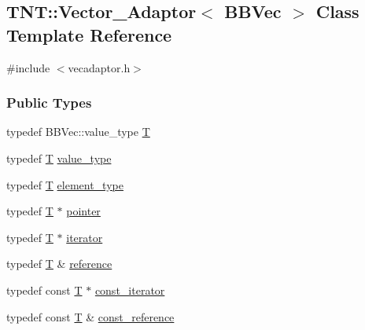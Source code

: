 \subsection{TNT::Vector\_\-Adaptor$<$ BBVec $>$ Class Template Reference}
\label{class_t_n_t_1_1_vector___adaptor}


{\ttfamily \#include $<$vecadaptor.h$>$}

\subsubsection*{Public Types}
\begin{DoxyCompactItemize}
\item 
typedef BBVec::value\_\-type \hyperlink{class_t_n_t_1_1_vector___adaptor_a8f689dfb94d76130f5327e00f2d10b97}{T}
\item 
typedef \hyperlink{class_t_n_t_1_1_vector___adaptor_a8f689dfb94d76130f5327e00f2d10b97}{T} \hyperlink{class_t_n_t_1_1_vector___adaptor_ad07bb058fd4897043b5059ace9000ecf}{value\_\-type}
\item 
typedef \hyperlink{class_t_n_t_1_1_vector___adaptor_a8f689dfb94d76130f5327e00f2d10b97}{T} \hyperlink{class_t_n_t_1_1_vector___adaptor_ae7e58ba9bd702d20ff419a36b54627c9}{element\_\-type}
\item 
typedef \hyperlink{class_t_n_t_1_1_vector___adaptor_a8f689dfb94d76130f5327e00f2d10b97}{T} $\ast$ \hyperlink{class_t_n_t_1_1_vector___adaptor_a7ea8869896cd022dddda67b59dc65010}{pointer}
\item 
typedef \hyperlink{class_t_n_t_1_1_vector___adaptor_a8f689dfb94d76130f5327e00f2d10b97}{T} $\ast$ \hyperlink{class_t_n_t_1_1_vector___adaptor_a53f46904c8fdab6553959b7176829806}{iterator}
\item 
typedef \hyperlink{class_t_n_t_1_1_vector___adaptor_a8f689dfb94d76130f5327e00f2d10b97}{T} \& \hyperlink{class_t_n_t_1_1_vector___adaptor_a0b32370a0c8d85460988cca7ac36cfca}{reference}
\item 
typedef const \hyperlink{class_t_n_t_1_1_vector___adaptor_a8f689dfb94d76130f5327e00f2d10b97}{T} $\ast$ \hyperlink{class_t_n_t_1_1_vector___adaptor_a4dac0b1b3dacfbba4dc6fdd9bec7eef0}{const\_\-iterator}
\item 
typedef const \hyperlink{class_t_n_t_1_1_vector___adaptor_a8f689dfb94d76130f5327e00f2d10b97}{T} \& \hyperlink{class_t_n_t_1_1_vector___adaptor_aa1387887d6104a4256a80106d145afa0}{const\_\-reference}
\end{DoxyCompactItemize}
